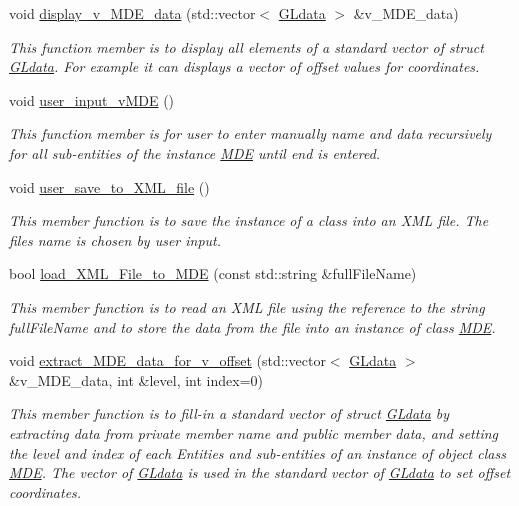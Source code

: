 \begin{DoxyCompactItemize}
void \hyperlink{group__group__display_ga38a0f84bbf5c8652014c84fa7ce92610}{display\+\_\+v\+\_\+\+M\+D\+E\+\_\+data} (std\+::vector$<$ \hyperlink{structGLdata}{G\+Ldata} $>$ \&v\+\_\+\+M\+D\+E\+\_\+data)
\begin{DoxyCompactList}\small\item\em This function member is to display all elements of a standard vector of struct \hyperlink{structGLdata}{G\+Ldata}. For example it can displays a vector of offset values for coordinates. \end{DoxyCompactList}\item 
void \hyperlink{classMDE_abfe9ff721cd10f55b8f641ef7674d4ab}{user\+\_\+input\+\_\+v\+M\+DE} ()
\begin{DoxyCompactList}\small\item\em This function member is for user to enter manually \textquotesingle{}name\textquotesingle{} and \textquotesingle{}data\textquotesingle{} recursively for all sub-\/entities of the instance \hyperlink{classMDE}{M\+DE} until \textquotesingle{}end\textquotesingle{} is entered. \end{DoxyCompactList}\item 
void \hyperlink{group__group__io_gab0bb5af067d456163cd8d672945acc20}{user\+\_\+save\+\_\+to\+\_\+\+X\+M\+L\+\_\+file} ()
\begin{DoxyCompactList}\small\item\em This member function is to save the instance of a class into an X\+ML file. The file\textquotesingle{}s name is chosen by user input. \end{DoxyCompactList}\item 
bool \hyperlink{group__group__io_gadd7f1e7519e60fad799462002ddfd6fd}{load\+\_\+\+X\+M\+L\+\_\+\+File\+\_\+to\+\_\+\+M\+DE} (const std\+::string \&full\+File\+Name)
\begin{DoxyCompactList}\small\item\em This member function is to read an X\+ML file using the reference to the string full\+File\+Name and to store the data from the file into an instance of class \hyperlink{classMDE}{M\+DE}. \end{DoxyCompactList}\item 
void \hyperlink{group__group__io_gad5a5a84a32ba35ff2c35f3a60fb2c44f}{extract\+\_\+\+M\+D\+E\+\_\+data\+\_\+for\+\_\+v\+\_\+offset} (std\+::vector$<$ \hyperlink{structGLdata}{G\+Ldata} $>$ \&v\+\_\+\+M\+D\+E\+\_\+data, int \&level, int index=0)
\begin{DoxyCompactList}\small\item\em This member function is to fill-\/in a standard vector of struct \hyperlink{structGLdata}{G\+Ldata} by extracting data from private member \textquotesingle{}name\textquotesingle{} and public member \textquotesingle{}data\textquotesingle{}, and setting the level and index of each Entities and sub-\/entities of an instance of object class \hyperlink{classMDE}{M\+DE}. The vector of \hyperlink{structGLdata}{G\+Ldata} is used in the standard vector of \hyperlink{structGLdata}{G\+Ldata} to set offset coordinates. \end{DoxyCompactList}\item 

\end{DoxyCompactItemize}
